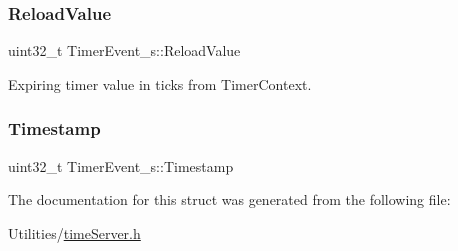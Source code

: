 \mbox{\label{structTimerEvent__s_a1a2ffdc3bb2cebe3ab97250f6618f5ce}} 
\subsubsection{\texorpdfstring{Reload\+Value}{ReloadValue}}
{\footnotesize\ttfamily uint32\+\_\+t Timer\+Event\+\_\+s\+::\+Reload\+Value}



Expiring timer value in ticks from Timer\+Context. 

\mbox{\label{structTimerEvent__s_a9f933d63b25c3416b42345b695872c59}} 
\subsubsection{\texorpdfstring{Timestamp}{Timestamp}}
{\footnotesize\ttfamily uint32\+\_\+t Timer\+Event\+\_\+s\+::\+Timestamp}



The documentation for this struct was generated from the following file\+:\begin{DoxyCompactItemize}
\item 
Utilities/\hyperlink{timeServer_8h}{time\+Server.\+h}\end{DoxyCompactItemize}
